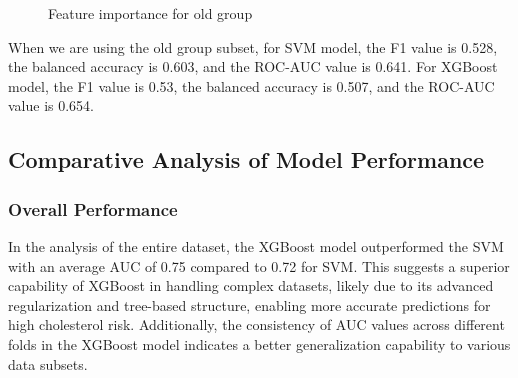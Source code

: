 \documentclass{article}
\begin{document}
\begin{figure}[!ht]
    \centering
    \qquad
    \caption{Feature importance for old group}
\end{figure}

When we are using the old group subset, for SVM model, the F1 value is 0.528, the balanced accuracy is 0.603, and the ROC-AUC value is 0.641. For XGBoost model, the F1 value is 0.53, the balanced accuracy is 0.507, and the ROC-AUC value is 0.654.

\subsection{Comparative Analysis of Model Performance}

\subsubsection{Overall Performance}
In the analysis of the entire dataset, the XGBoost model outperformed the SVM with an average AUC of 0.75 compared to 0.72 for SVM. This suggests a superior capability of XGBoost in handling complex datasets, likely due to its advanced regularization and tree-based structure, enabling more accurate predictions for high cholesterol risk. Additionally, the consistency of AUC values across different folds in the XGBoost model indicates a better generalization capability to various data subsets.
\end{document}
